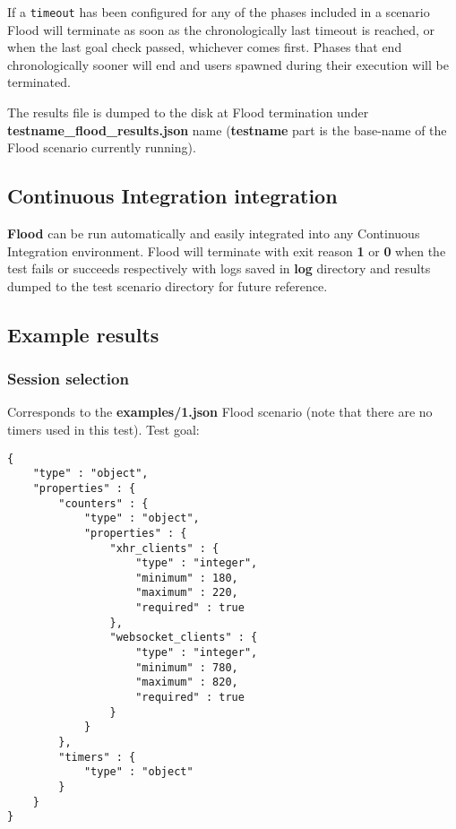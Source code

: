 \documentclass[a4paper]{article}
\begin{document}
\noindent
If a \texttt{timeout} has been configured for any of the phases included in a scenario Flood will terminate as soon as the chronologically last timeout is reached, or when the last goal check passed, whichever comes first. Phases that end chronologically sooner will end and users spawned during their execution will be terminated.

\noindent
The results file is dumped to the disk at Flood termination under \textbf{testname\_flood\_results.json} name (\textbf{testname} part is the base-name of the Flood scenario currently running).
\subsection{Continuous Integration integration}
\label{sec-4-3}

\textbf{Flood} can be run automatically and easily integrated into any Continuous Integration environment. Flood will terminate with exit reason \textbf{1} or \textbf{0} when the test fails or succeeds respectively with logs saved in \textbf{log} directory and results dumped to the test scenario directory for future reference.
\subsection{Example results}
\label{sec-4-4}
\label{ref-example_results}
\subsubsection{Session selection}
\label{sec-4-4-1}

Corresponds to the \textbf{examples/1.json} Flood scenario (note that there are no timers used in this test). Test goal:


\begin{verbatim}
{
    "type" : "object",
    "properties" : {
        "counters" : {
            "type" : "object",
            "properties" : {
                "xhr_clients" : {
                    "type" : "integer",
                    "minimum" : 180,
                    "maximum" : 220,
                    "required" : true
                },
                "websocket_clients" : {
                    "type" : "integer",
                    "minimum" : 780,
                    "maximum" : 820,
                    "required" : true
                }
            }
        },
        "timers" : {
            "type" : "object"
        }
    }
}
\end{verbatim}
\end{document}
